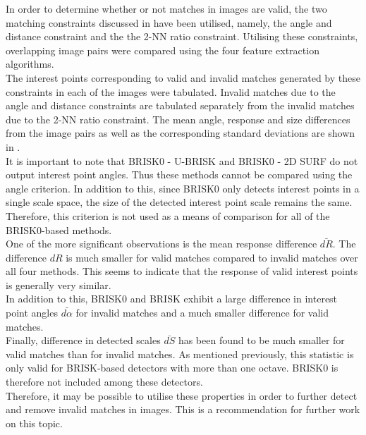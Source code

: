 \documentclass{report}
\begin{document}
In order to determine whether or not matches in images are valid, the two matching constraints discussed in  have been utilised, namely, the angle and distance constraint and the the 2-NN ratio constraint. Utilising these constraints, overlapping image pairs were compared using the four feature extraction algorithms. \\

The interest points corresponding to valid and invalid matches generated by these constraints in each of the images were tabulated. Invalid matches due to the angle and distance constraints are tabulated separately from the invalid matches due to the 2-NN ratio constraint. The mean angle, response and size differences from the image pairs as well as the corresponding standard deviations are shown in .\\

It is important to note that BRISK0 - U-BRISK and BRISK0 - 2D SURF do not output interest point angles. Thus these methods cannot be compared using the angle criterion. In addition to this, since BRISK0 only detects interest points in a single scale space, the size of the detected interest point scale remains the same. Therefore, this criterion is not used as a means of comparison for all of the BRISK0-based methods.\\

One of the more significant observations is the mean response difference $\bar{dR}$. The difference $dR$ is much smaller for valid matches compared to invalid matches over all four methods. This seems to indicate that the response of valid interest points is generally very similar.\\

In addition to this, BRISK0 and BRISK exhibit a large difference in interest point angles $\bar{d\alpha}$ for invalid matches and a much smaller difference for valid matches. \\

Finally, difference in detected scales $\bar{dS}$ has been found to be much smaller for valid matches than for invalid matches. As mentioned previously, this statistic is only valid for BRISK-based detectors with more than one octave. BRISK0 is therefore not included among these detectors.\\

Therefore, it may be possible to utilise these properties in order to further detect and remove invalid matches in images. This is a recommendation for further work on this topic.\\
\end{document}
